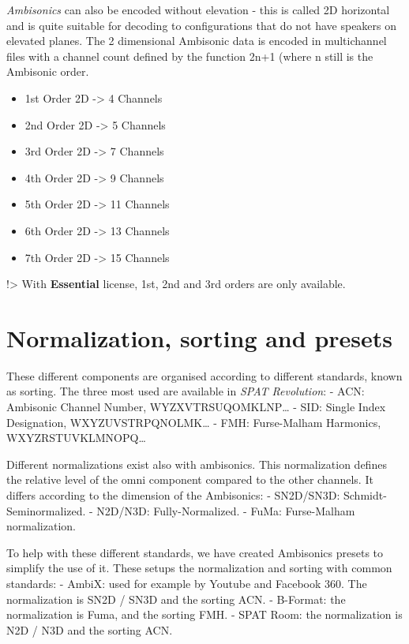 \documentclass[
  letterpaper,
  DIV=11,
  numbers=noendperiod]{scrreport}
\providecommand{\tightlist}{%
  \setlength{\itemsep}{0pt}\setlength{\parskip}{0pt}}\usepackage{longtable,booktabs,array}
\begin{document}
\emph{Ambisonics} can also be encoded without elevation - this is called
2D horizontal and is quite suitable for decoding to configurations that
do not have speakers on elevated planes. The 2 dimensional Ambisonic
data is encoded in multichannel files with a channel count defined by
the function 2n+1 (where n still is the Ambisonic order.

\begin{itemize}
\tightlist
\item
  1st Order 2D -\textgreater{} 4 Channels
\item
  2nd Order 2D -\textgreater{} 5 Channels
\item
  3rd Order 2D -\textgreater{} 7 Channels
\item
  4th Order 2D -\textgreater{} 9 Channels
\item
  5th Order 2D -\textgreater{} 11 Channels
\item
  6th Order 2D -\textgreater{} 13 Channels
\item
  7th Order 2D -\textgreater{} 15 Channels
\end{itemize}

!\textgreater{} With \textbf{Essential} license, 1st, 2nd and 3rd orders
are only available.

\hypertarget{normalization-sorting-and-presets}{%
\section{Normalization, sorting and
presets}\label{normalization-sorting-and-presets}}

These different components are organised according to different
standards, known as sorting. The three most used are available in
\emph{SPAT Revolution}: - ACN: Ambisonic Channel Number,
WYZXVTRSUQOMKLNP\ldots{} - SID: Single Index Designation,
WXYZUVSTRPQNOLMK\ldots{} - FMH: Furse-Malham Harmonics,
WXYZRSTUVKLMNOPQ\ldots{}

Different normalizations exist also with ambisonics. This normalization
defines the relative level of the omni component compared to the other
channels. It differs according to the dimension of the Ambisonics: -
SN2D/SN3D: Schmidt-Seminormalized. - N2D/N3D: Fully-Normalized. - FuMa:
Furse-Malham normalization.

To help with these different standards, we have created Ambisonics
presets to simplify the use of it. These setups the normalization and
sorting with common standards: - AmbiX: used for example by Youtube and
Facebook 360. The normalization is SN2D / SN3D and the sorting ACN. -
B-Format: the normalization is Fuma, and the sorting FMH. - SPAT Room:
the normalization is N2D / N3D and the sorting ACN.
\end{document}
